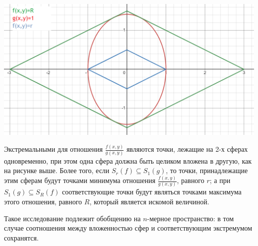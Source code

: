 \documentclass{article}
\begin{document}
\vspace{2mm}
\includegraphics[scale=0.4]{pictures/spheres.png}

Экстремальными для отношения $ \frac{f(x,y)}{g(x,y)} $ являются точки, лежащие на 2-х сферах одновременно, при этом одна сфера должна быть целиком вложена в другую, как на рисунке выше. Более того, если $S_r(f) \subseteq S_1(g) $, то точки, принадлежащие этим сферам будут точками минимума отношения $ \frac{f(x,y)}{g(x,y)} $, равного $r$; а при $S_1(g) \subseteq S_R(f) $ соответствующие точки будут являться точками максимума этого отношения, равного $R$, который является искомой величиной.

Такое исследование подлежит обобщению на $n$-мерное пространство: в том случае соотношения между вложенностью сфер и соответствующим экстремумом сохранятся.
\end{document}

